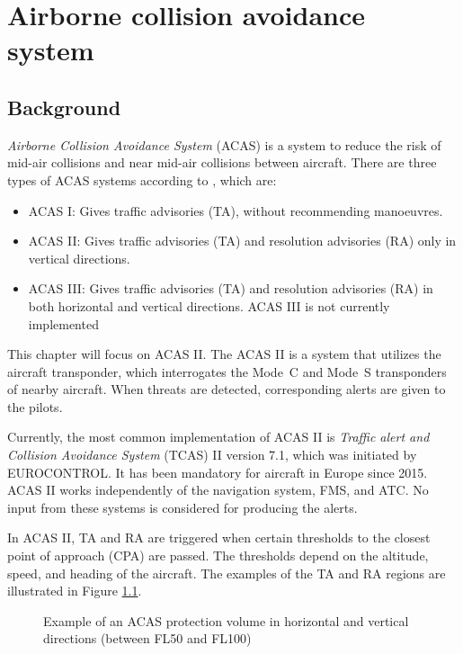 \chapter{Airborne collision avoidance system}

\section{Background}

\emph{Airborne Collision Avoidance System} (ACAS) is a system to reduce the risk of mid-air collisions and near mid-air collisions between aircraft. There are three types of ACAS systems according to \cite{icaoA10V4}, which are:

\begin{itemize}
  \item ACAS I: Gives traffic advisories (TA), without recommending manoeuvres.
  \item ACAS II: Gives traffic advisories (TA) and resolution advisories (RA) only in vertical directions.
  \item ACAS III: Gives traffic advisories (TA) and resolution advisories (RA) in both horizontal and vertical directions. ACAS III is not currently implemented
\end{itemize}

This chapter will focus on ACAS II. The ACAS II is a system that utilizes the aircraft transponder, which interrogates the Mode~C and Mode~S transponders of nearby aircraft. When threats are detected, corresponding alerts are given to the pilots.

Currently, the most common implementation of ACAS II is \emph{Traffic alert and Collision Avoidance System} (TCAS) II version 7.1, which was initiated by EUROCONTROL. It has been mandatory for aircraft in Europe since 2015. ACAS II works independently of the navigation system, FMS, and ATC. No input from these systems is considered for producing the alerts.

In ACAS II, TA and RA are triggered when certain thresholds to the closest point of approach (CPA) are passed. The thresholds depend on the altitude, speed, and heading of the aircraft. The examples of the TA and RA regions are illustrated in Figure \ref{fig:acas_regions}.

\begin{figure}[ht]
  \centering
  
  \caption{Example of an ACAS protection volume in horizontal and vertical directions (between FL50 and FL100)}
  \label{fig:acas_regions}
\end{figure}




